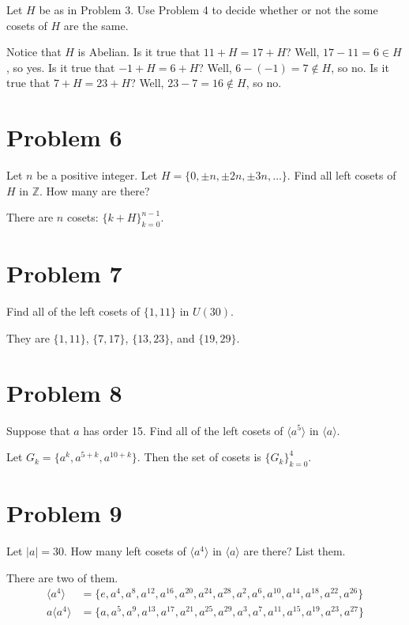 \documentclass{article}
\begin{document}
Let $H$ be as in Problem 3.  Use Problem 4 to decide whether or not the
some cosets of $H$ are the same.

Notice that $H$ is Abelian.
Is it true that $11+H=17+H$?  Well, $17-11=6\in H$, so yes.
Is it true that $-1+H=6+H$?  Well, $6-(-1)=7\not\in H$, so no.
Is it true that $7+H=23+H$?  Well, $23-7=16\not\in H$, so no.

\section*{Problem 6}

Let $n$ be a positive integer.  Let $H=\{0,\pm n,\pm 2n,\pm 3n,\dots\}$.
Find all left cosets of $H$ in $\mathbb{Z}$.  How many are there?

There are $n$ cosets: $\{k+H\}_{k=0}^{n-1}$.

\section*{Problem 7}

Find all of the left cosets of $\{1,11\}$ in $U(30)$.

They are $\{1,11\}$, $\{7,17\}$, $\{13,23\}$, and $\{19,29\}$.

\section*{Problem 8}

Suppose that $a$ has order 15.  Find all of the left cosets of $\langle a^5\rangle$ in
$\langle a\rangle$.

Let $G_k=\{a^k,a^{5+k},a^{10+k}\}$.  Then the set of cosets is $\{G_k\}_{k=0}^4$.

\section*{Problem 9}

Let $|a|=30$.  How many left cosets of $\langle a^4\rangle$ in $\langle a\rangle$ are there?
List them.

There are two of them.
\begin{align*}
\langle a^4\rangle &= \{e,a^4,a^8,a^{12},a^{16},a^{20},a^{24},a^{28},a^2,a^6,a^{10},a^{14},a^{18},
a^{22},a^{26}\} \\
a\langle a^4\rangle &= \{a,a^5,a^9,a^{13},a^{17},a^{21},a^{25},a^{29},a^3,a^7,a^{11},a^{15},a^{19},
a^{23},a^{27}\}
\end{align*}
\end{document}
